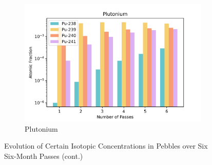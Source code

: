 \begin{figure}[H]\ContinuedFloat
\centering

\begin{subfigure}{0.95\textwidth}
  \includegraphics[width=0.95\linewidth]{figures/compositions/plutonium}
  \caption{Plutonium}
  \label{fig:pu}
\end{subfigure}%

\caption{Evolution of Certain Isotopic Concentrations in Pebbles over Six Six-Month Passes (cont.)}
\label{fig:comps}
\end{figure}